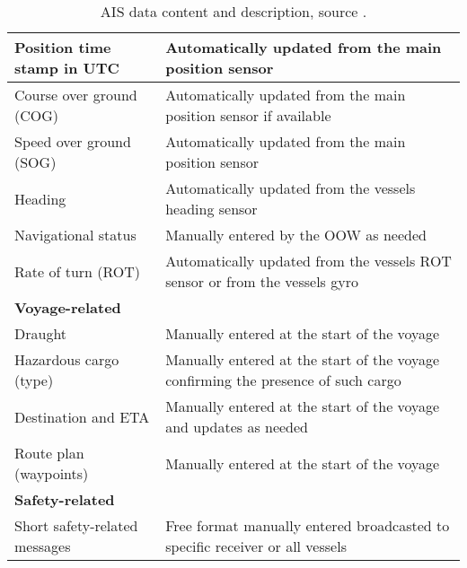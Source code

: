 \documentclass[../main.tex]{subfiles}
\begin{document}
\begin{table}[H]
\begin{tabular}{|m{5cm}|m{9cm}|}
Position time stamp in UTC                                   & Automatically updated from the main position sensor                               \\ \hline
Course over ground (COG)                                     & Automatically updated from the main position sensor if available                  \\ \hline
Speed over ground (SOG)                                      & Automatically updated from the main position sensor                               \\ \hline
Heading                                                      & Automatically updated from the vessels heading sensor                             \\ \hline
Navigational status                                          & Manually entered by the OOW as needed                                             \\ \hline
Rate of turn (ROT)                                           & Automatically updated from the vessels ROT sensor or from the vessels gyro        \\ \hline
\rowcolor[HTML]{C0C0C0} 
\textbf{Voyage-related}                                      &                                                                                   \\ \hline
Draught                                                      & Manually entered at the start of the voyage                                       \\ \hline
Hazardous cargo (type)                                       & Manually entered at the start of the voyage confirming the presence of such cargo \\ \hline
Destination and ETA                                          & Manually entered at the start of the voyage and updates as needed                 \\ \hline
Route plan (waypoints)                                       & Manually entered at the start of the voyage                                       \\ \hline
\rowcolor[HTML]{C0C0C0} 
\textbf{Safety-related}                                      &                                                                                   \\ \hline
Short safety-related messages                                & Free format manually entered broadcasted to specific receiver or all vessels      \\ \hline
\end{tabular}
\caption{AIS data content and description, source \cite{IMO_2015}.}
\label{tab:ais-data}
\end{table}
\end{document}
